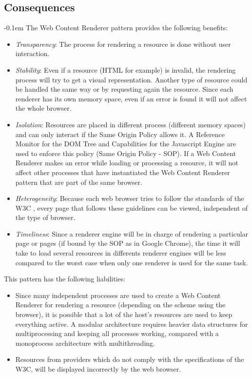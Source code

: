\documentclass[prodmode,acmtecs]{acmsmall}
\begin{document}
  \subsection*{Consequences}
  \leftskip-0.1em The Web Content Renderer pattern provides the following benefits:
  \begin{itemize}\leftskip0.2em
    \item \textit{Transparency}: The process for rendering a resource is done without user interaction.
    \item \textit{Stability}: Even if a resource (HTML for example) is invalid, the rendering process will try to get a visual representation. Another type of resource could be handled the same way or by requesting again the resource. Since each renderer has its own memory space, even if an error is found it will not affect the whole browser.
    \item \textit{Isolation}: Resources are placed in different process (different memory spaces) and can only interact if the Same Origin Policy allows it. A Reference Monitor for the DOM Tree and Capabilities for the Javascript Engine are used to enforce this policy (Same Origin Policy - SOP). If a Web Content Renderer makes an error while loading or processing a resource, it will not affect other processes that have instantiated the Web Content Renderer pattern that are part of the same browser.
    \item \textit{Heterogeneity}: Because each web browser tries to follow the standards of the W3C \cite{w3c}, every page that follows these guidelines can be viewed, independent of the type of browser.
    \item \textit{Timeliness}: Since a renderer engine will be in charge of rendering a particular page or pages (if bound by the SOP as in Google Chrome), the time it will take to load several resources in differents renderer engines will be less compared to the worst case when only one renderer is used for the same task.
  \end{itemize}
  This pattern has the following liabilities:
  \begin{itemize}\leftskip0.2em
    \item Since many independent processes are used to create a Web Content Renderer for rendering a resource (depending on the scheme using the browser), it is possible that a lot of the host's resources are used to keep everything active. A modular architecture requires heavier data structures for multiprocessing and keeping all processes working, compared with a monoprocess architecture with multithreading.
    \item Resources from providers which do not comply with the specifications of the W3C, will be displayed incorrectly by the web browser.
  \end{itemize}
\end{document}
